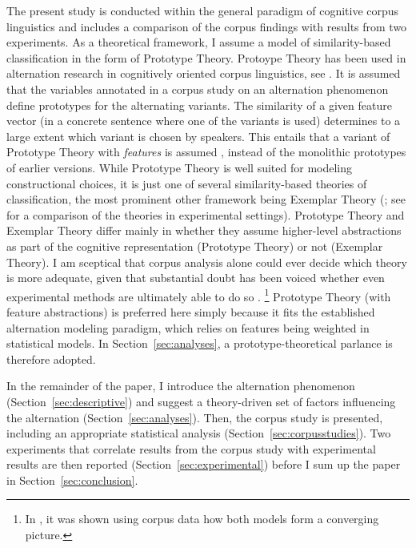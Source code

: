 \documentclass[USenglish]{article}
\begin{document}
The present study is conducted within the general paradigm of cognitive corpus linguistics and includes a comparison of the corpus findings with results from two experiments.
As a theoretical framework, I assume a model of similarity-based classification in the form of Prototype Theory.
Protoype Theory has been used in alternation research in cognitively oriented corpus linguistics, see \cite{DivjakArppe2013,Gries2003}.
It is assumed that the variables annotated in a corpus study on an alternation phenomenon define prototypes for the alternating variants.
The similarity of a given feature vector (in a concrete sentence where one of the variants is used) determines to a large extent which variant is chosen by speakers.
This entails that a variant of Prototype Theory with \textit{features} is assumed \citep{Rosch1978}, instead of the monolithic prototypes of earlier versions.
While Prototype Theory is well suited for modeling constructional choices, it is just one of several similarity-based theories of classification, the most prominent other framework being Exemplar Theory (\citealp{MedinSchaffer1978,Hintzman1986}; see \citealp{StormsEa2000} for a comparison of the theories in experimental settings).
Prototype Theory and Exemplar Theory differ mainly in whether they assume higher-level abstractions as part of the cognitive representation (Prototype Theory) or not (Exemplar Theory).
I am sceptical that corpus analysis alone could ever decide which theory is more adequate, given that substantial doubt has been voiced whether even experimental methods are ultimately able to do so \citep{Barsalou1990}.%
\footnote{In \cite{DivjakArppe2013}, it was shown using corpus data how both models form a converging picture.}
Prototype Theory (with feature abstractions) is preferred here simply because it fits the established alternation modeling paradigm, which relies on features being weighted in statistical models.
In Section~\ref{sec:analyses}, a prototype-theoretical parlance is therefore adopted.

In the remainder of the paper, I introduce the alternation phenomenon (Section~\ref{sec:descriptive}) and suggest a theory-driven set of factors influencing the alternation (Section~\ref{sec:analyses}).
Then, the corpus study is presented, including an appropriate statistical analysis (Section~\ref{sec:corpusstudies}).
Two experiments that correlate results from the corpus study with experimental results are then reported (Section~\ref{sec:experimental}) before I sum up the paper in Section~\ref{sec:conclusion}.
\end{document}
